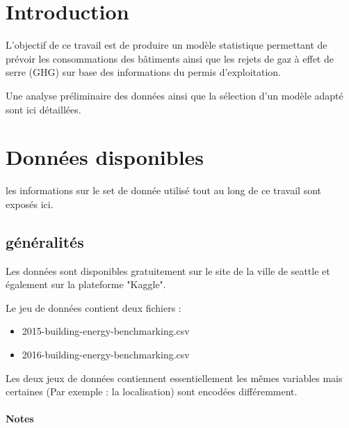 
\section{Introduction}

L'objectif de ce travail est de produire un modèle statistique permettant de prévoir
les consommations des bâtiments ainsi que les rejets de gaz à effet de serre (GHG) sur
base des informations du permis d'exploitation.

Une analyse préliminaire des données ainsi que la sélection d'un modèle
adapté sont ici détaillées.

\section{Données disponibles}

les informations sur le set de donnée utilisé tout au long de ce travail sont exposés ici.

\subsection{généralités}

Les données sont disponibles gratuitement sur le site de la ville de seattle et
également sur la plateforme "Kaggle".

Le jeu de données contient deux fichiers :
\begin{itemize}
  \item{2015-building-energy-benchmarking.csv}
  \item{2016-building-energy-benchmarking.csv}
\end{itemize}

Les deux jeux de données contiennent essentiellement les mêmes variables mais
certaines (Par exemple : la localisation) sont encodées différemment.

\paragraph{Notes}

